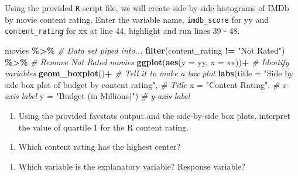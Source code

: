 \documentclass[
]{report}
\newenvironment{Shaded}{\begin{snugshade}}{\end{snugshade}}
\newcommand{\CommentTok}[1]{\textcolor[rgb]{0.56,0.35,0.01}{\textit{#1}}}
\newcommand{\DataTypeTok}[1]{\textcolor[rgb]{0.13,0.29,0.53}{#1}}
\newcommand{\KeywordTok}[1]{\textcolor[rgb]{0.13,0.29,0.53}{\textbf{#1}}}
\newcommand{\NormalTok}[1]{#1}
\newcommand{\OperatorTok}[1]{\textcolor[rgb]{0.81,0.36,0.00}{\textbf{#1}}}
\newcommand{\StringTok}[1]{\textcolor[rgb]{0.31,0.60,0.02}{#1}}
\providecommand{\tightlist}{%
  \setlength{\itemsep}{0pt}\setlength{\parskip}{0pt}}
\begin{document}
Using the provided \texttt{R} script file, we will create side-by-side histograms of IMDb by movie content rating. Enter the variable name, \texttt{imdb\_score} for yy and \texttt{content\_rating} for xx at line 44, highlight and run lines 39 - 48.

\begin{Shaded}
\begin{Highlighting}[]
\NormalTok{movies }\OperatorTok{\%\textgreater{}\%}\StringTok{  }\CommentTok{\# Data set piped into...}
\StringTok{  }\KeywordTok{filter}\NormalTok{(content\_rating }\OperatorTok{!=}\StringTok{ "Not Rated"}\NormalTok{) }\OperatorTok{\%\textgreater{}\%}\StringTok{ }\CommentTok{\# Remove Not Rated movies}
\StringTok{  }\KeywordTok{ggplot}\NormalTok{(}\KeywordTok{aes}\NormalTok{(}\DataTypeTok{y =}\NormalTok{ yy, }\DataTypeTok{x =}\NormalTok{ xx))}\OperatorTok{+}\StringTok{  }\CommentTok{\# Identify variables}
\StringTok{  }\KeywordTok{geom\_boxplot}\NormalTok{()}\OperatorTok{+}\StringTok{  }\CommentTok{\# Tell it to make a box plot}
\StringTok{  }\KeywordTok{labs}\NormalTok{(}\DataTypeTok{title =} \StringTok{"Side by side box plot of budget by content rating"}\NormalTok{,  }\CommentTok{\# Title}
       \DataTypeTok{x =} \StringTok{"Content Rating"}\NormalTok{,    }\CommentTok{\# x{-}axis label}
       \DataTypeTok{y =} \StringTok{"Budget (in Millions)"}\NormalTok{)  }\CommentTok{\# y{-}axis label}
\end{Highlighting}
\end{Shaded}

\begin{enumerate}
\def\labelenumi{\arabic{enumi}.}
\tightlist
\item
  Using the provided favstats output and the side-by-side box plots, interpret the value of quartile 1 for the R content rating.
\end{enumerate}

\vspace{1in}

\begin{enumerate}
\def\labelenumi{\arabic{enumi}.}
\setcounter{enumi}{1}
\tightlist
\item
  Which content rating has the highest center?
\end{enumerate}

\vspace{0.2in}

\begin{enumerate}
\def\labelenumi{\arabic{enumi}.}
\setcounter{enumi}{2}
\tightlist
\item
  Which variable is the explanatory variable? Response variable?
\end{enumerate}
\end{document}
